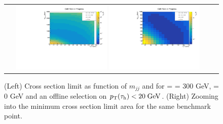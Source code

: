 \begin{figure}[tbh!]
	\centering
	\begin{tabular}{cc}
		\includegraphics[width=0.45\textwidth]{analysis/pics/JetInvMass_vs_MET_xsec_chi300_lsp000_taupt20.pdf}
		\includegraphics[width=0.45\textwidth]{analysis/pics/JetInvMass_vs_MET_xsec_chi300_lsp000_taupt20_zoom.pdf}
	\end{tabular}
	\caption{(Left) Cross section limit as function of $m_{jj}$ and \met for \charginopm = \neutralinotwo = 300 GeV, \neutralinoone = 0 GeV and an offline selection on $p_{\text{T}}(\tau_{\text{h}}) <  20\;\text{Ge}\kern-0.06667em\text{V}$. (Right) Zooming into the minimum cross section limit area for the same benchmark point.}
	\label{fig::JetInvMass_vs_MET_xsec_chi300_lsp000_taupt20}
\end{figure}

